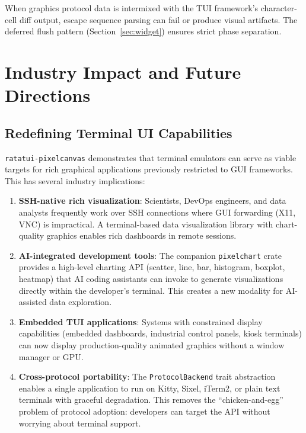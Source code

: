 \documentclass[11pt, a4paper, twocolumn]{article}
\begin{document}
When graphics protocol data is intermixed with the TUI framework's character-cell diff output, escape sequence parsing can fail or produce visual artifacts.
The deferred flush pattern (Section~\ref{sec:widget}) ensures strict phase separation.

\section{Industry Impact and Future Directions}
\label{sec:impact}

\subsection{Redefining Terminal UI Capabilities}

\texttt{ratatui-pixelcanvas} demonstrates that terminal emulators can serve as viable targets for rich graphical applications previously restricted to GUI frameworks.
This has several industry implications:

\begin{enumerate}[leftmargin=1.5em, itemsep=0.2em]
    \item \textbf{SSH-native rich visualization}: Scientists, DevOps engineers, and data analysts frequently work over SSH connections where GUI forwarding (X11, VNC) is impractical.
    A terminal-based data visualization library with chart-quality graphics enables rich dashboards in remote sessions.

    \item \textbf{AI-integrated development tools}: The companion \texttt{pixelchart} crate provides a high-level charting API (scatter, line, bar, histogram, boxplot, heatmap) that AI coding assistants can invoke to generate visualizations directly within the developer's terminal.
    This creates a new modality for AI-assisted data exploration.

    \item \textbf{Embedded TUI applications}: Systems with constrained display capabilities (embedded dashboards, industrial control panels, kiosk terminals) can now display production-quality animated graphics without a window manager or GPU.

    \item \textbf{Cross-protocol portability}: The \texttt{ProtocolBackend} trait abstraction enables a single application to run on Kitty, Sixel, iTerm2, or plain text terminals with graceful degradation.
    This removes the ``chicken-and-egg'' problem of protocol adoption: developers can target the API without worrying about terminal support.
\end{enumerate}
\end{document}
